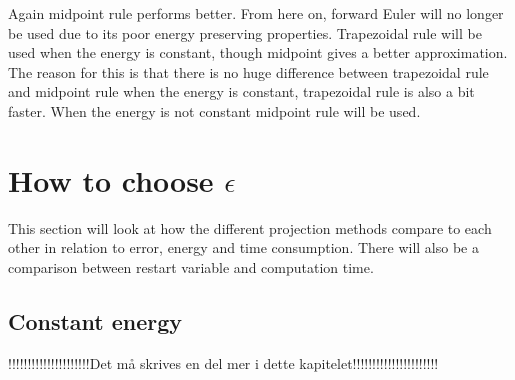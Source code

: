 Again midpoint rule performs better. From here on, forward Euler will no longer be used due to its poor energy preserving properties. Trapezoidal rule will be used when the energy is constant, though midpoint gives a better approximation. The reason for this is that there is no huge difference between trapezoidal rule and midpoint rule when the energy is constant, trapezoidal rule is also a bit faster. When the energy is not constant midpoint rule will be used. 

\section{How to choose $\epsilon$} %
This section will look at how the different projection methods compare to each other in relation to error, energy and time consumption. There will also be a comparison between restart variable and computation time. 



\subsection{Constant energy} \label{sec:SLMconstant}%
!!!!!!!!!!!!!!!!!!!!!Det må skrives en del mer i dette kapitelet!!!!!!!!!!!!!!!!!!!!!!\\

